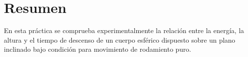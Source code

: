 \section{Resumen}
En esta práctica se comprueba experimentalmente la relación entre la energía, la altura y el tiempo de
descenso de un cuerpo esférico dispuesto sobre un plano inclinado bajo condición para movimiento de
rodamiento puro.